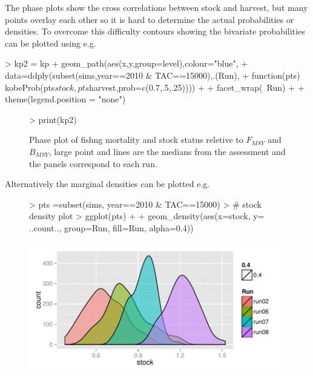 \documentclass[shortnames,nojss,article]{jss}
\begin{document}
The phase plots show the cross correlations between stock and harvest, but many points overlay each other so it is hard
to determine the actual probabilities or densities. To overcome this difficulty contours showing the bivariate probabilities 
can be plotted using  e.g.

\begin{Schunk}
\begin{Sinput}
> kp2 = kp + geom_path(aes(x,y,group=level),colour="blue",
+                     data=ddply(subset(sims,year==2010 & TAC==15000),.(Run), 
+                                function(pts) kobeProb(pts$stock,pts$harvest,prob=c(0.7,.5,.25)))) +
+                     facet_wrap(~Run) + 
+                     theme(legend.position = "none")
\end{Sinput}
\end{Schunk}

\begin{figure}\begin{center}
\begin{Schunk}
\begin{Sinput}
> print(kp2)
\end{Sinput}
\end{Schunk}
\caption{Phase plot of fishng mortality and stock status reletive to $F_{MSY}$ and  $B_{MSY}$, large point and lines are the medians
from the assessment and the panels correspond to  each run.}
\end{center}\end{figure}

\clearpage
Alternatively the marginal densities can be plotted e.g.

\begin{figure}\begin{center}
\begin{Schunk}
\begin{Sinput}
> pts =subset(sims, year==2010 & TAC==15000)
> # stock density plot
> ggplot(pts) + 
+   geom_density(aes(x=stock, y= ..count.., group=Run, fill=Run, alpha=0.4))
\end{Sinput}
\end{Schunk}
\includegraphics{kobe-021}
\end{center}\end{figure}
\end{document}
